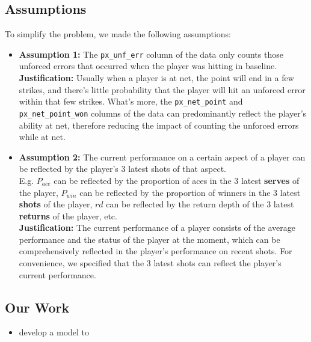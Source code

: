 \subsection{Assumptions}

To simplify the problem, we made the following assumptions:

\begin{itemize}
    \item \textbf{Assumption 1:} The \verb|px_unf_err| column of the data only counts those unforced errors that occurred when the player was hitting in baseline.\\
    \textbf{Justification:} Usually when a player is at net, the point will end in a few strikes, and there's little probability that the player will hit an unforced error within that few strikes. What's more, the \verb|px_net_point| and \verb|px_net_point_won| columns of the data can predominantly reflect the player's ability at net, therefore reducing the impact of counting the unforced errors while at net.
    
    \item \textbf{Assumption 2:} The current performance on a certain aspect of a player can be reflected by the player's 3 latest shots of that aspect.\\
    E.g. $P_{ace}$ can be reflected by the proportion of aces in the 3 latest \textbf{serves} of the player, $P_{win}$ can be reflected by the proportion of winners in the 3 latest \textbf{shots} of the player, $rd$ can be reflected by the return depth of the 3 latest \textbf{returns} of the player, etc. \\
    \textbf{Justification:} The current performance of a player consists of the average performance and the status of the player at the moment, which can be comprehensively reflected in the player's performance on recent shots. For convenience, we specified that the 3 latest shots can reflect the player's current performance.
\end{itemize}

\subsection{Our Work}

\begin{itemize}
    \item develop a model to 
\end{itemize}